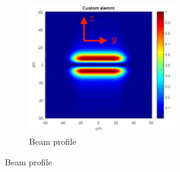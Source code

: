 \begin{figure}
    \begin{subfigure}{\textwidth}
        \centering
        \includegraphics[width=0.7\textwidth]{chapters/chapter_2/figures/tophat.png}
        \caption{Beam profile}
    \end{subfigure}


\end{figure}
